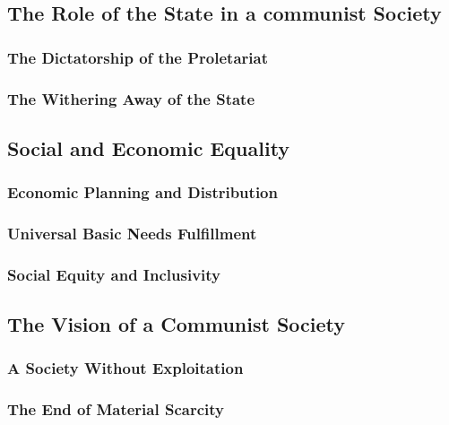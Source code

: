 \newpage

\subsection{The Role of the State in a communist Society}

\subsubsection{The Dictatorship of the Proletariat}

\subsubsection{The Withering Away of the State}

\newpage

\subsection{Social and Economic Equality}

\subsubsection{Economic Planning and Distribution}

\subsubsection{Universal Basic Needs Fulfillment}

\subsubsection{Social Equity and Inclusivity}

\newpage

\subsection{The Vision of a Communist Society}

\subsubsection{A Society Without Exploitation}

\subsubsection{The End of Material Scarcity}

